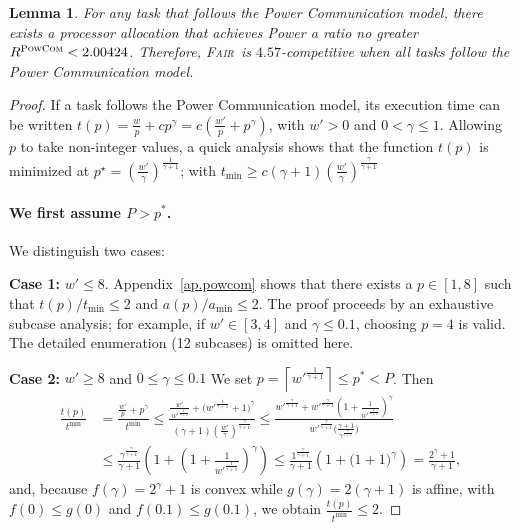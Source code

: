 \documentclass{article}
\newtheorem{lemma}{Lemma}
\newcommand\fair{\textsc{Fair}\xspace}
\newcommand\PCOM{\textsc{PowCom}\xspace}
\begin{document}
\begin{lemma}\label{lem.pcom}
For any task that follows the Power Communication model, there exists a processor allocation that achieves Power a ratio no greater $R^{\PCOM}<2.00424$. Therefore, \fair\ is $4.57$-competitive when all tasks follow the Power Communication model.
\end{lemma}
\begin{proof}
If a task follows the Power Communication model, its execution time can be written
$t(p) = \frac{w}{p} + c p^\gamma
       = c \left( \frac{w'}{p} + p^\gamma \right)$,
with $w'>0$ and $0<\gamma \le 1$. Allowing $p$ to take non-integer values, a quick analysis shows that
the function $t(p)$ is minimized at
$p^{\star} = \left( \frac{w'}{\gamma} \right)^{\frac{1}{\gamma+1}}$; with
 $t_{\min} \geq c\left( \gamma+1\right)\left( \frac{w'}{\gamma} \right)^{\frac{\gamma}{\gamma+1}}$

\paragraph{We first assume $P>p^*$.}
We distinguish two cases:

\textbf{Case 1:} $w' \le 8$.  
Appendix~\ref{ap.powcom} shows that there exists a $p\in[1,8]$ such that
$t(p)/t_{\min}\le 2$ and $a(p)/a_{\min}\le 2$.
The proof proceeds by an exhaustive subcase analysis; for example,
if $w' \in [3,4]$ and $\gamma\le 0.1$, choosing $p=4$ is valid.
The detailed enumeration (12 subcases) is omitted here.


\textbf{Case 2:} $w' \ge 8$ and $0\le\gamma\le 0.1$  
We set \(p=\left\lceil w'^{\frac{1}{\gamma+1}}\right\rceil \leq p^* <P\).  
Then  
\begin{align*}
\frac{t(p)}{t^{\min}} &= \frac{\frac{w'}{p}+p^\gamma}{t^{\min}} \le \frac{\frac{w'}{\,w'^{\frac{1}{\gamma+1}}} + \bigl(w'^{\frac{1}{\gamma+1}}+1\bigr)^\gamma}
        {(\gamma+1)\!\left(\frac{w'}{\gamma}\right)^{\frac{\gamma}{\gamma+1}}} \le \frac{w'^{\frac{\gamma}{\gamma+1}}
          + w'^{\frac{\gamma}{\gamma+1}}\!\left(1+\frac{1}{w'^{\frac{1}{\gamma+1}}}\right)^\gamma}
        {w'^{\frac{\gamma}{\gamma+1}}
          \bigl(\tfrac{\gamma+1}{\gamma^{\frac{\gamma}{\gamma+1}}}\bigr)} \\
&\le \frac{\gamma^{\frac{\gamma}{\gamma+1}}}{\gamma+1}
       \left(1+\left(1+\frac{1}{w'^{\frac{1}{\gamma+1}}}\right)^\gamma\right) \le \frac{1^{\frac{\gamma}{\gamma+1}}}{\gamma+1}
       \left(1+\bigl(1+1\bigr)^\gamma\right)
     = \frac{2^\gamma+1}{\gamma+1},
\end{align*}
and, because \(f(\gamma)=2^\gamma+1\) is convex while 
\(g(\gamma)=2(\gamma+1)\) is affine, with 
\(f(0)\le g(0)\) and \(f(0.1)\le g(0.1)\), we obtain
\(\frac{t(p)}{t^{\min}}\le 2.\)


\end{proof}
\end{document}
